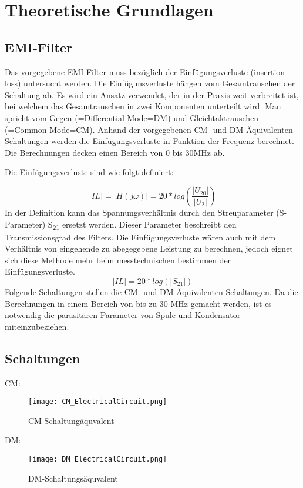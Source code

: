 \section{Theoretische Grundlagen} \label{sec:TheoretischeGrundlagen}

\subsection{EMI-Filter} \label{subsec:emifilter}
Das vorgegebene EMI-Filter muss bezüglich der Einfügungsverluste (insertion loss) untersucht werden. Die Einfügunsverluste hängen vom Gesamtrauschen der Schaltung ab. Es wird ein Ansatz verwendet, der in der Praxis weit verbreitet ist, bei welchem das Gesamtrauschen in zwei Komponenten unterteilt wird. Man spricht vom Gegen-(=Differential Mode=DM) und Gleichtaktrauschen (=Common Mode=CM). Anhand der vorgegebenen CM- und DM-Äquivalenten Schaltungen werden die Einfügungsverluste in Funktion der Frequenz berechnet. Die Berechnungen decken einen Bereich von 0 bis 30MHz ab.

Die Einfügungsverluste sind wie folgt definiert: 

\begin{equation}
\left\lvert IL\right\rvert =\left\lvert H(j\omega) \right\rvert = 20*log(\frac{ \left\lvert U_{20} \right\rvert }{ \left\lvert U_2 \right\rvert })
\end{equation}
In der Definition kann das Spannungsverhältnis durch den Streuparameter (S-Parameter) S\textsubscript{21} ersetzt werden. Dieser Parameter beschreibt den Transmissionsgrad des Filters. Die Einfügungsverluste wären auch mit dem Verhältnis von eingehende zu abegegebene Leistung zu berechnen, jedoch eignet sich diese Methode mehr beim messtechnischen bestimmen der Einfügungsverluste. 
\begin{equation}
\left\lvert IL\right\rvert = 20*log (\left\lvert S_{21} \right\rvert)
\end{equation}
Folgende Schaltungen stellen die CM- und DM-Äquivalenten Schaltungen. Da die Berechnungen in einem Bereich von bis zu 30 MHz gemacht werden, ist es notwendig die parasitären Parameter von Spule und Kondensator miteinzubeziehen.
\subsection{Schaltungen} \label{subsec:schaltungen}
CM:
\begin{figure}[H]
	\centering
	\texttt{[image: CM\_ElectricalCircuit.png]}
	\caption{CM-Schaltungäquvalent}
	\label{fig:CM-Schaltungäquvalent}
\end{figure}
DM:
\begin{figure}[H]
	\centering
	\texttt{[image: DM\_ElectricalCircuit.png]}
	\caption{DM-Schaltungsäquvalent}
	\label{fig:DM-Schaltungsäquvalent}
\end{figure}

